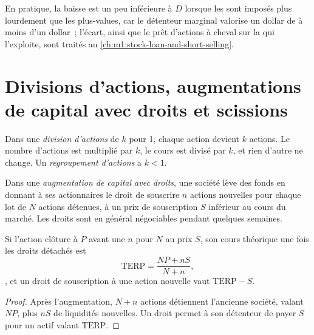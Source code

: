 En pratique, la baisse est un peu inférieure à $D$ lorsque les  sont imposés plus
lourdement que les plus-values, car le détenteur marginal valorise un dollar de
 à moins d'un dollar~; l'écart, ainsi que le prêt d'actions
à cheval sur la  qui l'exploite, sont traités au
\cref{ch:m1:stock-loan-and-short-selling}.

\section{Divisions d'actions, augmentations de capital avec droits et scissions}

\begin{definition}\label{def:m1:shares-corporate-actions-indices:split}
Dans une \emph{division d'actions} de $k$ pour 1, chaque action devient $k$
actions. Le nombre d'actions est multiplié par $k$, le cours est divisé par
$k$, et rien d'autre ne change. Un \emph{regroupement d'actions} a $k<1$.
\end{definition}

\begin{definition}\label{def:m1:shares-corporate-actions-indices:rights}
Dans une \emph{augmentation de capital avec droits}, une société lève des fonds en
donnant à ses actionnaires le droit de souscrire $n$ actions nouvelles pour chaque lot de $N$ actions détenues,
à un prix de souscription $S$ inférieur au cours du marché. Les droits sont en général
négociables pendant quelques semaines.
\end{definition}

\begin{proposition}\label{prop:m1:shares-corporate-actions-indices:terp}
Si l'action clôture à $P$ avant une  $n$ pour $N$ au prix $S$, son
cours théorique une fois les droits détachés est
\[
\mathrm{TERP} = \frac{NP + nS}{N+n},
\],
et un droit de souscription à une action nouvelle vaut $\mathrm{TERP} - S$.
\end{proposition}
\begin{proof}
Après l'augmentation, $N+n$ actions détiennent l'ancienne société, valant $NP$, plus $nS$ de
liquidités nouvelles. Un droit permet à son détenteur de payer $S$ pour un actif valant
$\mathrm{TERP}$.
\end{proof}

